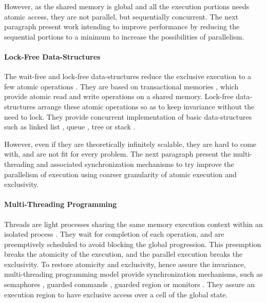 However, as the shared memory is global and all the execution portions needs atomic access, they are not parallel, but sequentially concurrent.
The next paragraph present work intending to improve performance by reducing the sequential portions to a minimum to increase the possibilities of parallelism.

\paragraph{Lock-Free Data-Structures}

The wait-free and lock-free data-structures reduce the exclusive execution to a few atomic operations \cite{Lamport1977,Herlihy1988,Herlihy1990,Herlihy1991,Anderson1990}.
They are based on transactional memories \cite{Harris2010}, which provide atomic read and write operations on a shared memory.
Lock-free data-structures arrange these atomic operations so as to keep invariance without the need to lock.
They provide concurrent implementation of basic data-structures such as linked list \cite{Valois1995,Timnat2012}, queue \cite{Sundell2003,Wimmer2015}, tree \cite{Ramachandran2015} or stack \cite{Hendler2004}.

However, even if they are theoretically infinitely scalable, they are hard to come with, and are not fit for every problem.
The next paragraph present the multi-threading and associated synchronization mechanisms to try improve the parallelism of execution using coarser granularity of atomic execution and exclusivity.



\paragraph{Multi-Threading Programming}

Threads are light processes sharing the same memory execution context within an isolated process \cite{Dijkstra1968}.
They wait for completion of each operation, and are preemptively scheduled to avoid blocking the global progression.
This preemption breaks the atomicity of the execution, and the parallel execution breaks the exclusivity.
To restore atomicity and exclusivity, hence assure the invariance, multi-threading programming model provide synchronization mechanisms, such as semaphores \cite{Dijkstra}, guarded commands \cite{Dijkstra1975}, guarded region \cite{Hansen1978a} or monitors \cite{Hoare1974}.
They assure an execution region to have exclusive access over a cell of the global state.

